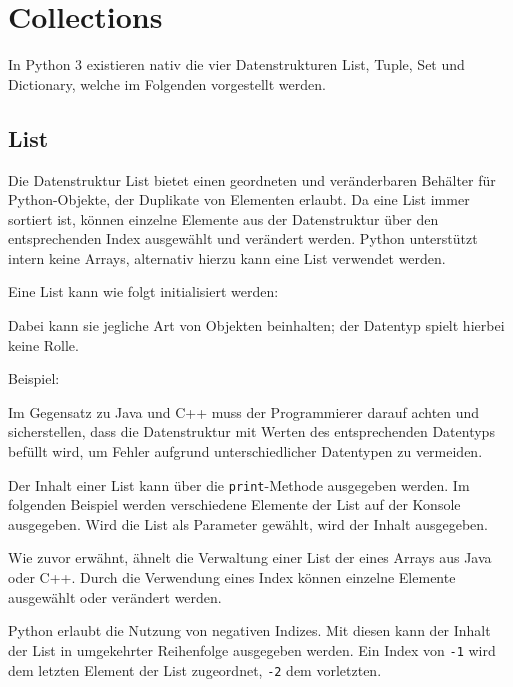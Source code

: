 \section{Collections}
\label{collections}

In Python 3 existieren nativ die vier Datenstrukturen List, Tuple, Set und Dictionary, welche im Folgenden vorgestellt werden.

\subsection{List}
\label{collections:list}
Die Datenstruktur List bietet einen geordneten und veränderbaren Behälter für Python-Objekte, der Duplikate von Elementen erlaubt. Da eine List immer sortiert ist, können einzelne Elemente aus der Datenstruktur über den entsprechenden Index ausgewählt und verändert werden. Python unterstützt intern keine Arrays, alternativ hierzu kann eine List verwendet werden.

Eine List kann wie folgt initialisiert werden:

\label{collections:lst:listinit}

Dabei kann sie jegliche Art von Objekten beinhalten; der Datentyp spielt hierbei keine Rolle. 

Beispiel:

\label{collections:lst:listdatatype}

Im Gegensatz zu Java und C++ muss der Programmierer darauf achten und sicherstellen, dass die Datenstruktur mit Werten des entsprechenden Datentyps befüllt wird, um Fehler aufgrund unterschiedlicher Datentypen zu vermeiden.

Der Inhalt einer List kann über die \lstinline$print$-Methode ausgegeben werden. Im folgenden Beispiel werden verschiedene Elemente der List auf der Konsole ausgegeben.
Wird die List als Parameter gewählt, wird der Inhalt ausgegeben.

\label{collections:lst:listprint}

Wie zuvor erwähnt, ähnelt die Verwaltung einer List der eines Arrays aus Java oder C++. Durch die Verwendung eines Index können einzelne Elemente ausgewählt oder verändert werden.

\label{collections:lst:listindex}

Python erlaubt die Nutzung von negativen Indizes. Mit diesen kann der Inhalt der List in umgekehrter Reihenfolge ausgegeben werden. Ein Index von \lstinline$-1$ wird dem letzten Element der List zugeordnet, \lstinline$-2$ dem vorletzten.

\label{collections:lst:lsitnegativeindex}

